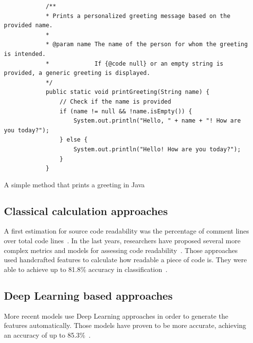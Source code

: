 \documentclass[%
class=scrreprt,
chapterprefix=false,%
open=right,%
twoside=false,%
paper=a4,%
logofile={Logo\_zentral\_farbig\_EN.png},%
thesistype=master,%
UKenglish,%
]{se2thesis}
\begin{document}
	
	\begin{listing}[!ht]
		\begin{verbatim}
			/**
			* Prints a personalized greeting message based on the provided name.
			*
			* @param name The name of the person for whom the greeting is intended.
			*             If {@code null} or an empty string is provided, a generic greeting is displayed.
			*/
			public static void printGreeting(String name) {
				// Check if the name is provided
				if (name != null && !name.isEmpty()) {
					System.out.println("Hello, " + name + "! How are you today?");
				} else {
					System.out.println("Hello! How are you today?");
				}
			}
		\end{verbatim}
		\caption{A simple method that prints a greeting in Java}
		\label{lst:print-greeting}
	\end{listing}
	

	
	
%	
%	
%	
	
	\subsection{Classical calculation approaches} \label{Classical calculation approaches}
	A first estimation for source code readability was the percentage of comment lines over total code lines~\cite{aggarwal2002integrated}. In the last years, researchers have proposed several more complex metrics and models for assessing code readability~\cite{buse2009learning, posnett2011simpler, dorn2012general, scalabrino2018comprehensive}.
	Those approaches used handcrafted features to calculate how readable a piece of code is. They were able to achieve up to 81.8\% accuracy in classification~\cite{scalabrino2018comprehensive}.
	
	\subsection{Deep Learning based approaches} \label{(Deep) Learning based approaches}
	More recent models use Deep Learning approaches in order to generate the features automatically. Those models have proven to be more accurate, achieving an accuracy of up to 85.3\%~\cite{mi2018improving, mi2022towards}.
	
\end{document}
